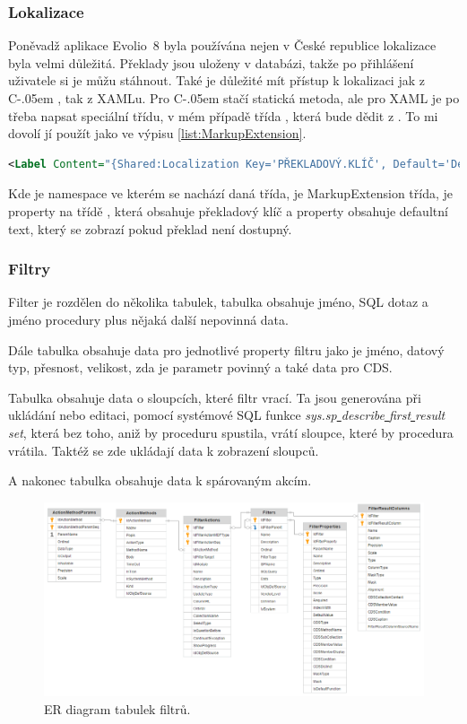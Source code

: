 \documentclass[czech,bachelorpractice,dept460,male,csharp]{diploma}
\newcommand{\EvolioEight}{Evolio~8}
\newcommand{\Csharp}{%
  {\settoheight{\dimen0}{C}C\kern-.05em \resizebox{!}{\dimen0}{\raisebox{\depth}{\#}}}}
\newcommand{\un}{\underline{ }}
\begin{document}
		\subsubsection{Lokalizace}
			Poněvadž aplikace {\EvolioEight} byla používána nejen v České republice lokalizace byla velmi důležitá. Překlady jsou uloženy v databázi, takže po přihlášení uživatele si je můžu stáhnout. Také je důležité mít přístup k lokalizaci jak z {\Csharp}, tak z XAMLu. Pro {\Csharp} stačí statická metoda, ale pro XAML je po třeba napsat speciální třídu, v mém případě třída , která bude dědit z . To mi dovolí jí
použít jako ve výpisu \ref{list:MarkupExtension}.
			\begin{lstlisting}[language=XML,caption={MarkupExtension příkad},label={list:MarkupExtension}]
<Label Content="{Shared:Localization Key='PŘEKLADOVÝ.KLÍČ', Default='Defaultní text'}"/>
			\end{lstlisting}
			 Kde  je namespace ve kterém se nachází daná třída,  je MarkupExtension třída,  je property na třídě , která obsahuje překladový klíč a property  obsahuje defaultní text, který se zobrazí pokud překlad není dostupný.
		\subsubsection{Filtry}
			Filter je rozdělen do několika tabulek, tabulka  obsahuje jméno, SQL dotaz a jméno procedury plus nějaká další nepovinná data. 
			
			Dále tabulka  obsahuje data pro jednotlivé property filtru jako je jméno, datový typ, přesnost, velikost, zda je parametr povinný a také data pro CDS. 
			
			Tabulka  obsahuje data o sloupcích, které filtr vrací. Ta jsou generována při ukládání nebo editaci, pomocí systémové SQL funkce \textit{sys.sp{\un}describe{\un}first{\un}result{\un}set}, která bez toho, aniž by proceduru spustila, vrátí sloupce, které by procedura vrátila. Taktéž se zde ukládají data k zobrazení sloupců. 
			
			A nakonec tabulka  obsahuje data k spárovaným akcím.
			\begin{figure}[h!]
				\includegraphics[width=1.0\textwidth]{Figures/ERdiagram.png}
				\caption{ER diagram tabulek filtrů.}
    			\label{fig:ERdiagram}
			\end{figure}
\end{document}

